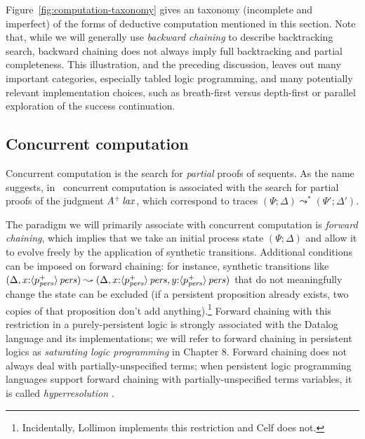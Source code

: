 Figure~\ref{fig:computation-taxonomy} gives an taxonomy (incomplete
and imperfect) of the forms of deductive computation mentioned in this
section. Note that, while we will generally use {\it backward
  chaining} to describe backtracking search, backward chaining does
not always imply full backtracking and partial completeness. This
illustration, and the preceding discussion, leaves out many important
categories, especially tabled logic programming, and many potentially
relevant implementation choices, such as breath-first versus
depth-first or parallel exploration of the success continuation.


\subsection{Concurrent computation}
\label{sec:framework-logicprog-trace}


Concurrent computation is the search for {\it partial} proofs of
sequents. As the name suggests, in \sls~concurrent computation is
associated with the search for partial proofs of the judgment
${A^+}\,{{\it lax}}$, which correspond to traces $(\Psi;
\Delta) \leadsto^* (\Psi'; \Delta')$. 

The paradigm we will primarily associate with concurrent computation
is {\it forward chaining}, which implies that we take an initial
process state $(\Psi;\Delta)$ and allow it to evolve freely by the
application of synthetic transitions. Additional conditions can be
imposed on forward chaining: for instance, synthetic transitions like
$(\Delta, x{:}{\langle {p^+_{\it pers}} \rangle}\,{{\it pers}}) \leadsto (\Delta,
x{:}{\langle {p^+_{\it pers}} \rangle}\,{{\it pers}}, y{:}{\langle {p^+_{\it pers}} \rangle}\,{{\it pers}})$ that
do not meaningfully change the state can be excluded (if a persistent
proposition already exists, two copies of that proposition don't add
anything).\footnote{Incidentally, Lollimon implements this restriction
  and Celf does not.} Forward chaining with this restriction in a
purely-persistent logic is strongly associated with the Datalog
language and its implementations; we will refer to forward chaining in
persistent logics as {\it saturating logic programming} in Chapter
8. Forward chaining does not always deal with partially-unspecified
terms; when persistent logic programming languages support forward
chaining with partially-unspecified terms variables, it is called {\it
  hyperresolution} \cite{fermuller01resolution}.

